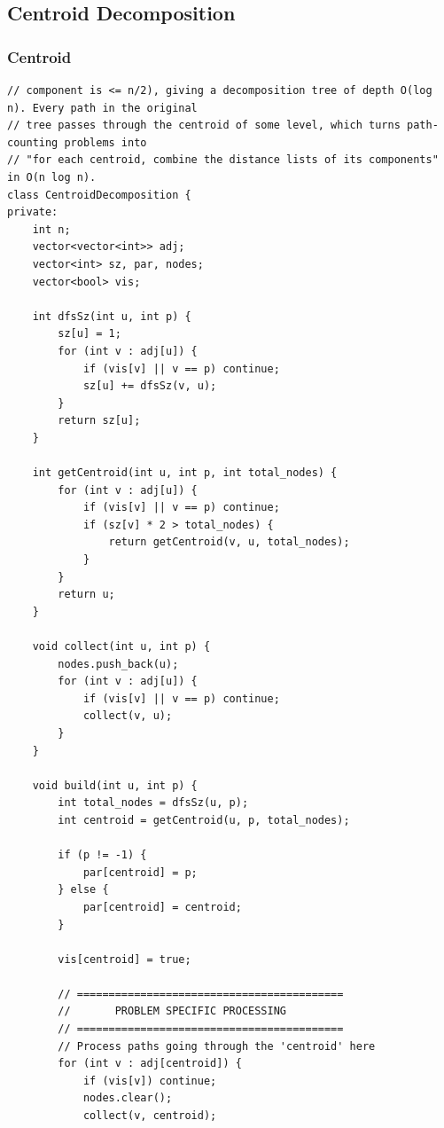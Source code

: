\documentclass[9pt,a4paper,twocolumn]{extarticle}
\begin{document}
\subsection{Centroid Decomposition}

\filbreak
\subsubsection{Centroid}
\nopagebreak
\begin{lstlisting}
// component is <= n/2), giving a decomposition tree of depth O(log n). Every path in the original
// tree passes through the centroid of some level, which turns path-counting problems into
// "for each centroid, combine the distance lists of its components" in O(n log n).
class CentroidDecomposition {
private:
    int n;
    vector<vector<int>> adj;
    vector<int> sz, par, nodes;
    vector<bool> vis;

    int dfsSz(int u, int p) {
        sz[u] = 1;
        for (int v : adj[u]) {
            if (vis[v] || v == p) continue;
            sz[u] += dfsSz(v, u);
        }
        return sz[u];
    }

    int getCentroid(int u, int p, int total_nodes) {
        for (int v : adj[u]) {
            if (vis[v] || v == p) continue;
            if (sz[v] * 2 > total_nodes) {
                return getCentroid(v, u, total_nodes);
            }
        }
        return u;
    }

    void collect(int u, int p) {
        nodes.push_back(u);
        for (int v : adj[u]) {
            if (vis[v] || v == p) continue;
            collect(v, u);
        }
    }

    void build(int u, int p) {
        int total_nodes = dfsSz(u, p);
        int centroid = getCentroid(u, p, total_nodes);
        
        if (p != -1) {
            par[centroid] = p;
        } else {
            par[centroid] = centroid;
        }
        
        vis[centroid] = true;

        // ==========================================
        //       PROBLEM SPECIFIC PROCESSING
        // ==========================================
        // Process paths going through the 'centroid' here
        for (int v : adj[centroid]) {
            if (vis[v]) continue;
            nodes.clear();
            collect(v, centroid);
            

\end{lstlisting}
\end{document}
